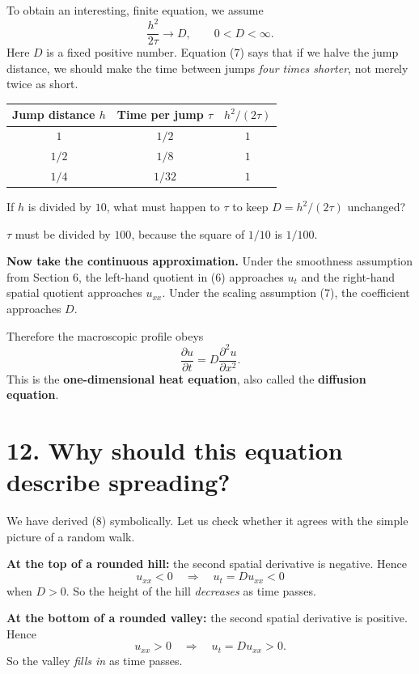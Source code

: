 \documentclass[11pt,a4paper]{article}
\newcommand{\ans}[1]{\par\vspace{4pt}{\small\color{blue}\textbf{Answer.}}\enspace #1}
\begin{document}
To obtain an interesting, finite equation, we assume
\[
\boxed{\displaystyle \frac{h^2}{2\tau}\longrightarrow D,\qquad 0<D<\infty.}
\tag{7}
\]
Here $D$ is a fixed positive number. Equation (7) says that if we halve the jump distance, we should make the time between jumps \emph{four times shorter}, not merely twice as short.

\begin{center}
\begin{tabular}{@{}ccc@{}}
\toprule
Jump distance $h$ & Time per jump $\tau$ & $h^2/(2\tau)$\\
\midrule
$1$ & $1/2$ & $1$\\
$1/2$ & $1/8$ & $1$\\
$1/4$ & $1/32$ & $1$\\
\bottomrule
\end{tabular}
\end{center}

\begin{think}
If $h$ is divided by $10$, what must happen to $\tau$ to keep $D=h^2/(2\tau)$ unchanged?
\ans{$\tau$ must be divided by $100$, because the square of $1/10$ is $1/100$.}
\end{think}

\textbf{Now take the continuous approximation.} Under the smoothness assumption from Section 6, the left-hand quotient in (6) approaches $u_t$ and the right-hand spatial quotient approaches $u_{xx}$. Under the scaling assumption (7), the coefficient approaches $D$.

Therefore the macroscopic profile obeys
\[
\boxed{\displaystyle \frac{\partial u}{\partial t}=D\frac{\partial^2u}{\partial x^2}.}
\tag{8}
\]
This is the \textbf{one-dimensional heat equation}, also called the \textbf{diffusion equation}.

\newpage
\section{12. Why should this equation describe spreading?}
We have derived (8) symbolically. Let us check whether it agrees with the simple picture of a random walk.

\textbf{At the top of a rounded hill:} the second spatial derivative is negative. Hence
\[
 u_{xx}<0\quad\Longrightarrow\quad u_t=Du_{xx}<0
\]
when $D>0$. So the height of the hill \emph{decreases} as time passes.

\textbf{At the bottom of a rounded valley:} the second spatial derivative is positive. Hence
\[
 u_{xx}>0\quad\Longrightarrow\quad u_t=Du_{xx}>0.
\]
So the valley \emph{fills in} as time passes.
\end{document}
